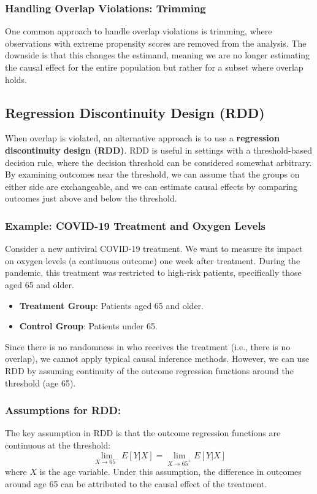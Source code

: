 \subsubsection{Handling Overlap Violations: Trimming}
One common approach to handle overlap violations is trimming, where observations with extreme propensity scores are removed from the analysis. The downside is that this changes the estimand, meaning we are no longer estimating the causal effect for the entire population but rather for a subset where overlap holds.

\subsection{Regression Discontinuity Design (RDD)}

When overlap is violated, an alternative approach is to use a \textbf{regression discontinuity design (RDD)}. RDD is useful in settings with a threshold-based decision rule, where the decision threshold can be considered somewhat arbitrary. By examining outcomes near the threshold, we can assume that the groups on either side are exchangeable, and we can estimate causal effects by comparing outcomes just above and below the threshold.

\subsubsection{Example: COVID-19 Treatment and Oxygen Levels}

Consider a new antiviral COVID-19 treatment. We want to measure its impact on oxygen levels (a continuous outcome) one week after treatment. During the pandemic, this treatment was restricted to high-risk patients, specifically those aged 65 and older.

\begin{itemize}
    \item \textbf{Treatment Group}: Patients aged 65 and older.
    \item \textbf{Control Group}: Patients under 65.
\end{itemize}

Since there is no randomness in who receives the treatment (i.e., there is no overlap), we cannot apply typical causal inference methods. However, we can use RDD by assuming continuity of the outcome regression functions around the threshold (age 65).

\subsubsection{Assumptions for RDD:}
The key assumption in RDD is that the outcome regression functions are continuous at the threshold:
$$\lim_{X \to 65^-} E[Y | X] = \lim_{X \to 65^+} E[Y | X]$$
where $X$ is the age variable. Under this assumption, the difference in outcomes around age 65 can be attributed to the causal effect of the treatment.

